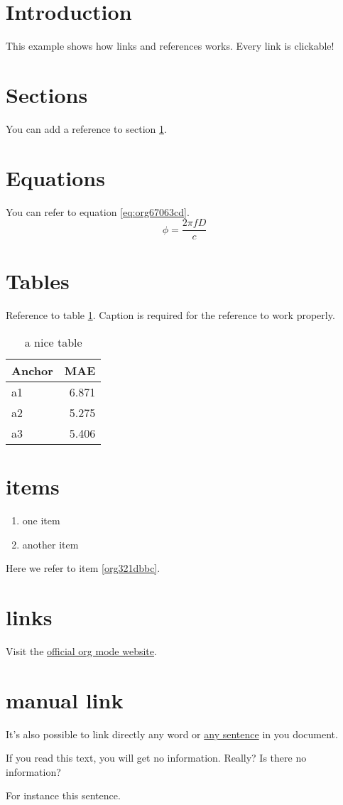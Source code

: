 


\section{Introduction}
\label{sec:org71d4cdd}
This example shows how links and references works.
Every link is clickable!

\section{Sections}
\label{sec:org4f0fa31}
You can add a reference to section \ref{sec:org71d4cdd}.

\section{Equations}
\label{sec:orgfe99674}
You can refer to equation \ref{eq:org67063cd}.
\begin{equation}
\label{eq:org67063cd}
\phi = \frac{2\pi fD}{c}
\end{equation}

\section{Tables}
\label{sec:org0372b85}
Reference to table \ref{tab:org7393be8}.
Caption is required for the reference to work properly.

\begin{table}[htbp]
\caption{\label{tab:org7393be8}
a nice table}
\centering
\begin{tabular}{lr}
Anchor & MAE\\
\hline
a1 & 6.871\\
a2 & 5.275\\
a3 & 5.406\\
\end{tabular}
\end{table}

\section{items}
\label{sec:org07d7b51}
\begin{enumerate}
\item one item
\item \label{org321dbbc}another item
\end{enumerate}
Here we refer to item \ref{org321dbbc}.

\section{links}
\label{sec:orgec9f7ff}
Visit the \href{https://orgmode.org/}{official org mode website}.

\section{manual link}
\label{sec:orgef71ade}
It's also possible to link directly any word
or \hyperlink{thesentence}{any sentence} in you document.

If you read this text, you will get no information.  Really?
Is there no information?

For instance \hypertarget{thesentence}{this sentence}.


